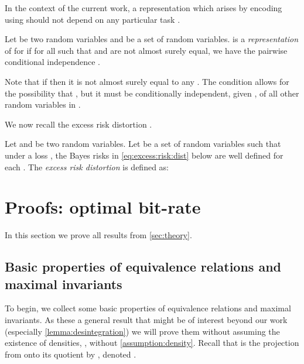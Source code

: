 \documentclass[final]{article}
\begin{document}
In the context of the current work, a representation  which arises by encoding  using  should not depend on any particular task . 

\begin{definition}\label{def:representations}
Let  be two random variables and  be a set of random variables.
 is a \textit{representation} of  for  if for all  such that  and  are not almost surely equal, we have the pairwise conditional independence .
\end{definition}

Note that if  then it is not almost surely equal to any . The condition allows for the possibility that , but it must be conditionally independent, given , of all other random variables in . 


We now recall the excess risk distortion \disttext{}.

\begin{definition}\label{def:excess_distortion}
Let  and  be two random variables.
Let  be a set of random variables such that under a loss , the Bayes risks in \eqref{eq:excess:risk:dist} below are well defined for each .
The \textit{excess risk distortion} \disttext{} is defined as:

\end{definition}





\clearpage
\newpage 
\section{Proofs: optimal bit-rate}
\label{appx:proofs}


In this section we prove all results from \cref{sec:theory}. 

\subsection{Basic properties of equivalence relations and maximal invariants}
\label{appx:maximal:invariants}

To begin, we collect some basic properties of equivalence relations and maximal invariants.
As these a general result that might be of interest beyond our work (especially \cref{lemma:desintegration}) we will prove them without assuming the existence of densities, \ie, without \cref{assumption:density}.
Recall that  is the projection from  onto its quotient by , denoted .
\end{document}
